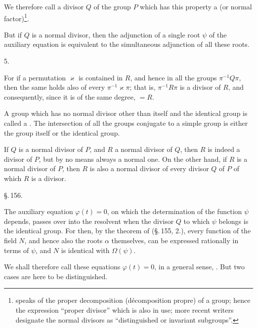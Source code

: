 
We therefore call a divisor $Q$ of the group $P$ which has this
property a  (or normal factor)\footnote{ speaks of the proper decomposition (d\'ecomposition propre) of a group; hence the expression ``proper divisor'' which is also in use; more recent writers designate the normal divisors as ``distinguished or invariant subgroups''.}.

But if $Q$ is a normal divisor, then the adjunction of a
single root $\psi$ of the auxiliary equation is equivalent to the
simultaneous adjunction of all these roots.

5. 

For if a permutation $\varkappa$ is contained in $R$, and hence in all the groups
$\pi^{-1}Q\pi$, then the same holds also of every $\pi^{-1}\varkappa\pi$;
that is, $\pi^{-1}R\pi$ is a divisor of $R$, and consequently, since it is of the same
degree, $= R$.

A group which has no normal divisor other than itself and the identical
group is called a .
The intersection of all the groups conjugate to a simple group
is either the group itself or the identical group.

If $Q$ is a normal divisor of $P$, and $R$ a normal divisor
of $Q$, then $R$ is indeed a divisor of $P$, but by no means always
a normal one. On the other hand, if $R$ is a normal divisor of $P$, then $R$
is also a normal divisor of every divisor $Q$ of $P$ of which $R$
is a divisor.

\begin{center}
\S.\,156.

\end{center}

The auxiliary equation $\varphi(t) = 0$, on which the determination of the
function $\psi$ depends, passes over into the  resolvent
when the divisor $Q$ to which $\psi$ belongs is the identical group.
For then, by the theorem of  (\S.\,155, 2.),
every function of the field $N$, and hence also the roots $\alpha$ themselves,
can be expressed rationally in terms of $\psi$, and $N$ is identical with $\Omega(\psi)$.

We shall therefore call these equations $\varphi(t) = 0$, in a general
sense, . But two cases are here
to be distinguished.
